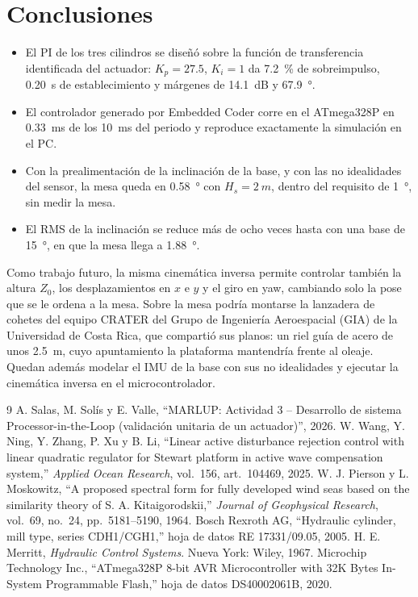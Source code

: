 \documentclass[conference]{IEEEtran}
\begin{document}
\section{Conclusiones}
\begin{itemize}
\item El PI de los tres cilindros se diseñó sobre la función de transferencia identificada del actuador: $K_p=27.5$, $K_i=1$ da \SI{7.2}{\percent} de sobreimpulso, \SI{0.20}{s} de establecimiento y márgenes de \SI{14.1}{dB} y \SI{67.9}{\degree}.
\item El controlador generado por Embedded Coder corre en el ATmega328P en \SI{0.33}{ms} de los \SI{10}{ms} del periodo y reproduce exactamente la simulación en el PC.
\item Con la prealimentación de la inclinación de la base, y con las no idealidades del sensor, la mesa queda en \SI{0.58}{\degree} con $H_s=\SI{2}{m}$, dentro del requisito de \SI{1}{\degree}, sin medir la mesa.
\item El RMS de la inclinación se reduce más de ocho veces hasta con una base de \SI{15}{\degree}, en que la mesa llega a \SI{1.88}{\degree}.
\end{itemize}
Como trabajo futuro, la misma cinemática inversa permite controlar también la altura $Z_0$, los desplazamientos en $x$ e $y$ y el giro en yaw, cambiando solo la pose que se le ordena a la mesa. Sobre la mesa podría montarse la lanzadera de cohetes del equipo CRATER del Grupo de Ingeniería Aeroespacial (GIA) de la Universidad de Costa Rica, que compartió sus planos: un riel guía de acero de unos \SI{2.5}{m}, cuyo apuntamiento la plataforma mantendría frente al oleaje. Quedan además modelar el IMU de la base con sus no idealidades y ejecutar la cinemática inversa en el microcontrolador.

\begin{thebibliography}{9}
 A. Salas, M. Solís y E. Valle, ``MARLUP: Actividad 3 -- Desarrollo de sistema Processor-in-the-Loop (validación unitaria de un actuador)'', 2026.
 W. Wang, Y. Ning, Y. Zhang, P. Xu y B. Li, ``Linear active disturbance rejection control with linear quadratic regulator for Stewart platform in active wave compensation system,'' \textit{Applied Ocean Research}, vol.~156, art.~104469, 2025.
 W. J. Pierson y L. Moskowitz, ``A proposed spectral form for fully developed wind seas based on the similarity theory of S. A. Kitaigorodskii,'' \textit{Journal of Geophysical Research}, vol.~69, no.~24, pp.~5181--5190, 1964.
 Bosch Rexroth AG, ``Hydraulic cylinder, mill type, series CDH1/CGH1,'' hoja de datos RE 17331/09.05, 2005.
 H. E. Merritt, \textit{Hydraulic Control Systems}. Nueva York: Wiley, 1967.
 Microchip Technology Inc., ``ATmega328P 8-bit AVR Microcontroller with 32K Bytes In-System Programmable Flash,'' hoja de datos DS40002061B, 2020.
\end{thebibliography}
\end{document}
